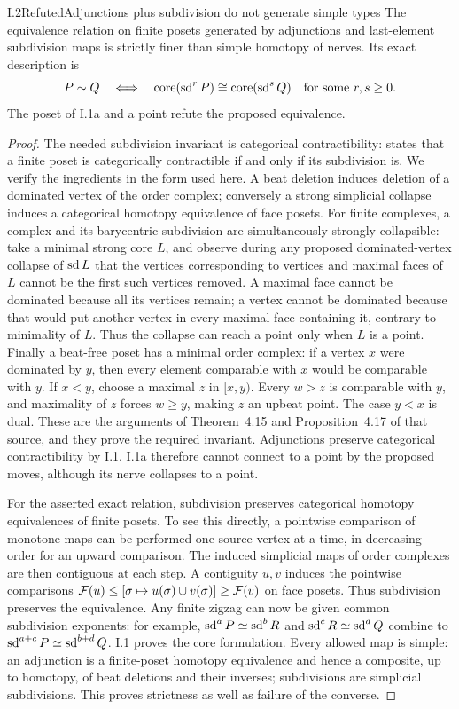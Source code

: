 \begin{claim}{I.2}{Refuted}{Adjunctions plus subdivision do not generate simple types}
The equivalence relation on finite posets generated by adjunctions and
last-element subdivision maps is strictly finer than simple homotopy
of nerves. Its exact description is
\[
 P\sim Q\quad\Longleftrightarrow\quad
 \operatorname{core}(\operatorname{sd}^r P)\cong\operatorname{core}(\operatorname{sd}^s Q)
 \quad\hbox{for some }r,s\geq0.
\]
The poset of I.1a and a point refute the proposed equivalence.
\end{claim}
\begin{proof}
The needed subdivision invariant is categorical contractibility:
\cite[Corollary~4.18]{I_BarmakMinian2012} states that a finite poset is
categorically contractible if and only if its subdivision is. We verify
the ingredients in the form used here. A beat deletion induces deletion
of a dominated vertex of the order complex; conversely a strong
simplicial collapse induces a categorical homotopy equivalence of face
posets. For finite complexes, a complex and its barycentric subdivision
are simultaneously strongly collapsible: take a minimal strong core
$L$, and observe during any proposed dominated-vertex collapse of
$\operatorname{sd} L$ that the vertices corresponding to vertices and maximal faces
of $L$ cannot be the first such vertices removed. A maximal face cannot
be dominated because all its vertices remain; a vertex cannot be
dominated because that would put another vertex in every maximal face
containing it, contrary to minimality of $L$. Thus the collapse can
reach a point only when $L$ is a point. Finally a beat-free poset has a
minimal order complex: if a vertex $x$ were dominated by $y$, then every
element comparable with $x$ would be comparable with $y$. If $x<y$,
choose a maximal $z$ in $[x,y)$. Every $w>z$ is comparable with $y$,
and maximality of $z$ forces $w\geq y$, making $z$ an upbeat point.
The case $y<x$ is dual. These are the arguments of Theorem~4.15 and
Proposition~4.17 of that source, and they prove the required invariant.
Adjunctions preserve categorical contractibility by I.1. I.1a therefore
cannot connect to a point by the proposed moves, although its nerve
collapses to a point.

For the asserted exact relation, subdivision preserves categorical
homotopy equivalences of finite posets. To see this directly, a
pointwise comparison of monotone maps can be performed one source
vertex at a time, in decreasing order for an upward comparison. The
induced simplicial maps of order complexes are then contiguous at each
step. A contiguity $u,v$ induces the pointwise comparisons
$\mathcal F(u)\leq[\sigma\mapsto u(\sigma)\cup v(\sigma)]\geq\mathcal F(v)$
on face posets. Thus subdivision preserves the equivalence. Any finite
zigzag can now be given common subdivision exponents: for example,
$\operatorname{sd}^a P\simeq\operatorname{sd}^b R$ and $\operatorname{sd}^c R\simeq\operatorname{sd}^d Q$ combine to
$\operatorname{sd}^{a+c}P\simeq\operatorname{sd}^{b+d}Q$. I.1 proves the core formulation.
Every allowed map is simple: an adjunction is a finite-poset homotopy
equivalence and hence a composite, up to homotopy, of beat deletions
and their inverses; subdivisions are simplicial subdivisions. This proves
strictness as well as failure of the converse.
\end{proof}

